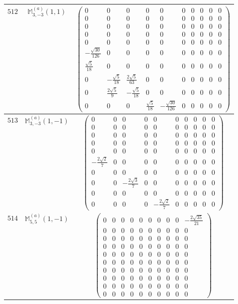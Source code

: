 \documentclass[fleqn,8pt,landscape]{jsarticle}
\begin{document}
\begin{center}
\begin{longtable}{ccc}
$ 512 $ & $ \mathbb{M}_{3,-3}^{(a)}(1,1) $ & $ \begin{pmatrix} 0 & 0 & 0 & 0 & 0 & 0 & 0 & 0 & 0 & 0 \\ 0 & 0 & 0 & 0 & 0 & 0 & 0 & 0 & 0 & 0 \\ 0 & 0 & 0 & 0 & 0 & 0 & 0 & 0 & 0 & 0 \\ 0 & 0 & 0 & 0 & 0 & 0 & 0 & 0 & 0 & 0 \\ 0 & 0 & 0 & 0 & 0 & 0 & 0 & 0 & 0 & 0 \\ - \frac{\sqrt{30}}{126} & 0 & 0 & 0 & 0 & 0 & 0 & 0 & 0 & 0 \\ \frac{\sqrt{5}}{18} & 0 & 0 & 0 & 0 & 0 & 0 & 0 & 0 & 0 \\ 0 & - \frac{\sqrt{5}}{18} & \frac{2 \sqrt{5}}{63} & 0 & 0 & 0 & 0 & 0 & 0 & 0 \\ 0 & \frac{2 \sqrt{5}}{9} & - \frac{\sqrt{5}}{18} & 0 & 0 & 0 & 0 & 0 & 0 & 0 \\ 0 & 0 & 0 & \frac{\sqrt{5}}{18} & - \frac{\sqrt{30}}{126} & 0 & 0 & 0 & 0 & 0 \end{pmatrix} $ \\ \hline
$ 513 $ & $ \mathbb{M}_{3,-3}^{(a)}(1,-1) $ & $ \begin{pmatrix} 0 & 0 & 0 & 0 & 0 & 0 & 0 & 0 & 0 & 0 \\ 0 & 0 & 0 & 0 & 0 & 0 & 0 & 0 & 0 & 0 \\ 0 & 0 & 0 & 0 & 0 & 0 & 0 & 0 & 0 & 0 \\ 0 & 0 & 0 & 0 & 0 & 0 & 0 & 0 & 0 & 0 \\ 0 & 0 & 0 & 0 & 0 & 0 & 0 & 0 & 0 & 0 \\ - \frac{2 \sqrt{2}}{7} & 0 & 0 & 0 & 0 & 0 & 0 & 0 & 0 & 0 \\ 0 & 0 & 0 & 0 & 0 & 0 & 0 & 0 & 0 & 0 \\ 0 & 0 & - \frac{2 \sqrt{3}}{7} & 0 & 0 & 0 & 0 & 0 & 0 & 0 \\ 0 & 0 & 0 & 0 & 0 & 0 & 0 & 0 & 0 & 0 \\ 0 & 0 & 0 & 0 & - \frac{2 \sqrt{2}}{7} & 0 & 0 & 0 & 0 & 0 \end{pmatrix} $ \\ \hline
$ 514 $ & $ \mathbb{M}_{5,5}^{(a)}(1,-1) $ & $ \begin{pmatrix} 0 & 0 & 0 & 0 & 0 & 0 & 0 & 0 & 0 & - \frac{2 \sqrt{35}}{21} \\ 0 & 0 & 0 & 0 & 0 & 0 & 0 & 0 & 0 & 0 \\ 0 & 0 & 0 & 0 & 0 & 0 & 0 & 0 & 0 & 0 \\ 0 & 0 & 0 & 0 & 0 & 0 & 0 & 0 & 0 & 0 \\ 0 & 0 & 0 & 0 & 0 & 0 & 0 & 0 & 0 & 0 \\ 0 & 0 & 0 & 0 & 0 & 0 & 0 & 0 & 0 & 0 \\ 0 & 0 & 0 & 0 & 0 & 0 & 0 & 0 & 0 & 0 \\ 0 & 0 & 0 & 0 & 0 & 0 & 0 & 0 & 0 & 0 \\ 0 & 0 & 0 & 0 & 0 & 0 & 0 & 0 & 0 & 0 \\ 0 & 0 & 0 & 0 & 0 & 0 & 0 & 0 & 0 & 0 \end{pmatrix} $ \\ \hline

\end{longtable}
\end{center}
\end{document}
